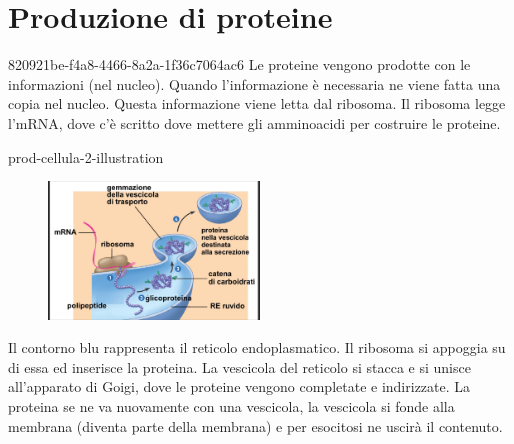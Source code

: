 \documentclass[preview]{standalone}
\begin{document}
\genpage

\section{Produzione di proteine}

\begin{snippet}{820921be-f4a8-4466-8a2a-1f36c7064ac6}
    Le proteine vengono prodotte con le informazioni (nel nucleo).
    Quando l'informazione è necessaria ne viene fatta una copia nel nucleo.
    Questa informazione viene letta dal ribosoma.
    Il ribosoma legge l'mRNA,
    dove c'è scritto dove mettere gli amminoacidi per costruire le proteine.
\end{snippet}

\begin{snippet}{prod-cellula-2-illustration}
    \setlength{\intextsep}{0pt}%
    \begin{figure}
        \includegraphics[width=0.5\textwidth]{./resources/prod-cellula2.png}
    \end{figure}

    Il contorno blu rappresenta il reticolo endoplasmatico.
    Il ribosoma si appoggia su di essa ed inserisce la proteina.
    La vescicola del reticolo si stacca e si unisce all'apparato di Goigi, dove le proteine
    vengono completate e indirizzate.
    La proteina se ne va nuovamente con una vescicola, la vescicola si fonde alla membrana (diventa parte della membrana)
    e per esocitosi ne uscirà il contenuto.

    \wrapfill
\end{snippet}
\end{document}
